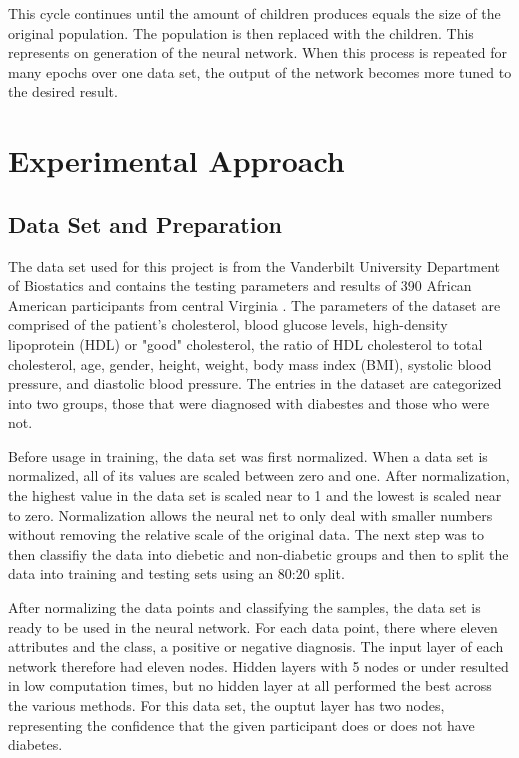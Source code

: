 \documentclass[12pt]{article}
\begin{document}
        This cycle continues until the amount of children produces equals the size of the original population.  The population
        is then replaced with the children.  This represents on generation of the neural network.
        When this process is repeated for many epochs over one data set, the output of the network becomes more
        tuned to the desired result.
\section{Experimental Approach}
    \subsection{Data Set and Preparation}
        The data set used for this project is from the Vanderbilt University Department of Biostatics and contains
        the testing parameters and results of 390 African American participants from central Virginia \cite{diabetesData}.
        The parameters of the dataset are comprised of the patient's cholesterol, blood glucose levels, high-density lipoprotein (HDL)
        or "good" cholesterol, the ratio of HDL cholesterol to total cholesterol, age, gender, height, weight, body mass index (BMI),
        systolic blood pressure, and diastolic blood pressure.  The entries in the dataset are categorized into two groups, those that
        were diagnosed with diabestes and those who were not.

        Before usage in training, the data set was first normalized.  When a data set is normalized, all of its values are scaled
        between zero and one.  After normalization, the highest value in the data set is scaled near to 1 and the lowest is scaled near to zero.
        Normalization allows the neural net to only deal with smaller numbers without removing the relative scale of the original data.
        The next step was to then classifiy the data into diebetic and non-diabetic groups and then to split the data into training and
        testing sets using an 80:20 split.

        After normalizing the data points and classifying the samples, the data set is ready to be used in the neural network.
        For each data point, there where eleven attributes and the class, a positive or negative diagnosis.
        The input layer of each network therefore had eleven nodes.
        Hidden layers with 5 nodes or under resulted in low computation times, but no hidden layer at all performed the best across the various methods.
        For this data set, the ouptut layer has two nodes, representing the confidence that the given participant does or does not have diabetes.
\end{document}
